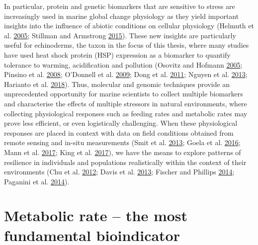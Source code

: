 \documentclass[a4paper,10pt, oneside]{memoir}
\begin{document}
In particular, protein and genetic biomarkers that are sensitive to stress are increasingly used in marine global change physiology as they yield important insights into the influence of abiotic conditions on cellular physiology (Helmuth et al. \protect\hyperlink{ref-Helmuth2005}{2005}; Stillman and Armstrong \protect\hyperlink{ref-Stillman2015}{2015}).
These new insights are particularly useful for echinoderms, the taxon in the focus of this thesis, where many studies have used heat shock protein (HSP) expression as a biomarker to quantify tolerance to warming, acidification and pollution (Osovitz and Hofmann \protect\hyperlink{ref-Osovitz2005}{2005}; Pinsino et al. \protect\hyperlink{ref-Pinsino2008}{2008}; O'Donnell et al. \protect\hyperlink{ref-ODonnell2009}{2009}; Dong et al. \protect\hyperlink{ref-Dong2011}{2011}; Nguyen et al. \protect\hyperlink{ref-Nguyen2013}{2013}; Harianto et al. \protect\hyperlink{ref-Harianto2018}{2018}).
Thus, molecular and genomic techniques provide an unprecedented opportunity for marine scientists to collect multiple biomarkers and characterise the effects of multiple stressors in natural environments, where collecting physiological responses such as feeding rates and metabolic rates may prove less efficient, or even logistically challenging.
When these physiological responses are placed in context with data on field conditions obtained from remote sensing and in-situ measurements (Smit et al. \protect\hyperlink{ref-Smit2013}{2013}; Goela et al. \protect\hyperlink{ref-Goela2016}{2016}; Mann et al. \protect\hyperlink{ref-Mann2017}{2017}; King et al. \protect\hyperlink{ref-King2017}{2017}), we have the means to explore patterns of resilience in individuals and populations realistically within the context of their environments (Chu et al. \protect\hyperlink{ref-Chu2012}{2012}; Davis et al. \protect\hyperlink{ref-Davis2013}{2013}; Fischer and Phillips \protect\hyperlink{ref-Fischer2014}{2014}; Paganini et al. \protect\hyperlink{ref-Paganini2014}{2014}).

\hypertarget{metabolic-rate-the-most-fundamental-bioindicator}{%
\section{Metabolic rate -- the most fundamental bioindicator}\label{metabolic-rate-the-most-fundamental-bioindicator}}
\end{document}
